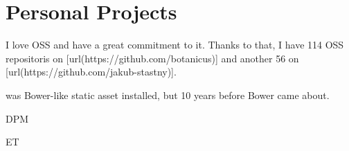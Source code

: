 
\blank \section{Personal Projects}
I love OSS and have a great commitment to it.
Thanks to that, I have 114 OSS repositoris on [url(https://github.com/botanicus)] and another 56 on [url(https://github.com/jakub-stastny)].


\startitemize
  \item \from[pupu][P] was Bower-like static asset installed, but 10 years before Bower came about.

  \item DPM
  \item ET
\stopitemize


